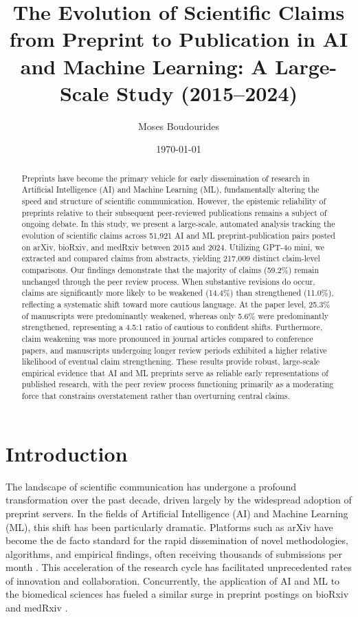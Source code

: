 \documentclass[11pt]{article}
\title{\textbf{The Evolution of Scientific Claims from Preprint to Publication in AI and Machine Learning: A Large-Scale Study (2015--2024)}}
\author{Moses Boudourides}
\affil{School of Professional Studies, Northwestern University \\ \texttt{Moses.Boudourides@northwestern.edu}}
\date{\today}
\begin{document}
\maketitle

\begin{abstract}
Preprints have become the primary vehicle for early dissemination of research in Artificial Intelligence (AI) and Machine Learning (ML), fundamentally altering the speed and structure of scientific communication. However, the epistemic reliability of preprints relative to their subsequent peer-reviewed publications remains a subject of ongoing debate. In this study, we present a large-scale, automated analysis tracking the evolution of scientific claims across 51,921 AI and ML preprint-publication pairs posted on arXiv, bioRxiv, and medRxiv between 2015 and 2024. Utilizing GPT-4o mini, we extracted and compared claims from abstracts, yielding 217,009 distinct claim-level comparisons. Our findings demonstrate that the majority of claims (59.2\%) remain unchanged through the peer review process. When substantive revisions do occur, claims are significantly more likely to be weakened (14.4\%) than strengthened (11.0\%), reflecting a systematic shift toward more cautious language. At the paper level, 25.3\% of manuscripts were predominantly weakened, whereas only 5.6\% were predominantly strengthened, representing a 4.5:1 ratio of cautious to confident shifts. Furthermore, claim weakening was more pronounced in journal articles compared to conference papers, and manuscripts undergoing longer review periods exhibited a higher relative likelihood of eventual claim strengthening. These results provide robust, large-scale empirical evidence that AI and ML preprints serve as reliable early representations of published research, with the peer review process functioning primarily as a moderating force that constrains overstatement rather than overturning central claims.
\end{abstract}

\section{Introduction}

The landscape of scientific communication has undergone a profound transformation over the past decade, driven largely by the widespread adoption of preprint servers. In the fields of Artificial Intelligence (AI) and Machine Learning (ML), this shift has been particularly dramatic. Platforms such as arXiv have become the de facto standard for the rapid dissemination of novel methodologies, algorithms, and empirical findings, often receiving thousands of submissions per month \cite{wang2020}. This acceleration of the research cycle has facilitated unprecedented rates of innovation and collaboration. Concurrently, the application of AI and ML to the biomedical sciences has fueled a similar surge in preprint postings on bioRxiv and medRxiv \cite{fraser2020}.
\end{document}
